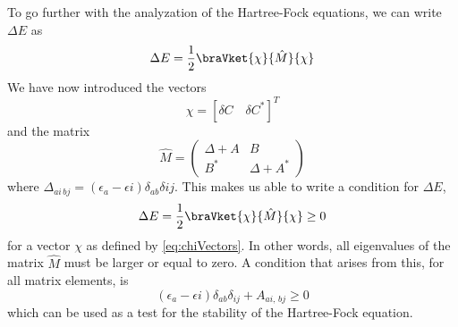 	To go further with the analyzation of the Hartree-Fock equations, we can write $\Delta E$ as
	\[
		\Delta E = \frac{1}{2}\braVket{\chi}{\hat{M}}{\chi}
	\]
	We have now introduced the vectors
	\begin{equation} \label{eq:chiVectors}
		\chi = \left [\delta C \quad \delta C^{*} \right]^{T}
	\end{equation}
	and the matrix
	\[
		\hat{M}=\left(\begin{array}{cc}
		\Delta+A & B\\
		B^{*} & \Delta+A^{*}
		\end{array}\right)
	\]
	where $\Delta_{ai\,bj}=(\epsilon_{a}-\epsilon{i})\delta_{ab}\delta{ij}$. This makes us able to write a condition for $\Delta E$,
	\[
		\Delta E = \frac{1}{2}\braVket{\chi}{\hat{M}}{\chi}\geq 0
	\]
	for a vector $\chi$ as defined by \ref{eq:chiVectors}. In other words, all eigenvalues of the matrix $\hat{M}$ must be larger or equal to zero. A condition that arises from this, for all matrix elements, is
	\[
		\left(\epsilon_{a} - \epsilon{i}\right)\delta_{ab}\delta_{ij}+A_{ai,\,bj}\geq 0
	\]
	which can be used as a test for the stability of the Hartree-Fock equation.

